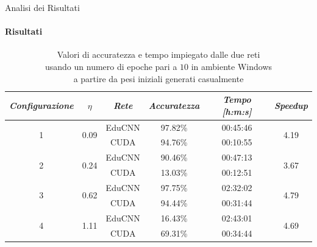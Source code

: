 \documentclass[
 ]{beamer}
\begin{document}
\begin{frame}{Analisi dei Risultati}
    \framesubtitle{Risultati}

        \begin{table}
            \centering
            \renewcommand\arraystretch{1.3}
            \small
            \begin{tabular}{| c | c | c | c | c | c |}
                \hline
                \emph{Configurazione} & $\eta$ & \emph{Rete} & \emph{Accuratezza} & \emph{Tempo [h:m:s]} & \emph{Speedup} \\
                \hline
                \multirow{2}{*}{1} & \multirow{2}{*}{0.09} & EduCNN & 97.82\% & 00:45:46 & \multirow{2}{*}{4.19} \\ \cline{3-5} 
                                   &                       & CUDA   & 94.76\% & 00:10:55  & \\
                \hline
                \multirow{2}{*}{2} & \multirow{2}{*}{0.24} & EduCNN & 90.46\% & 00:47:13 & \multirow{2}{*}{3.67} \\ \cline{3-5} 
                                   &                       & CUDA   & 13.03\% & 00:12:51 & \\
                \hline
                \multirow{2}{*}{3} & \multirow{2}{*}{0.62} & EduCNN & 97.75\% & 02:32:02 & \multirow{2}{*}{4.79} \\ \cline{3-5} 
                                   &                       & CUDA   & 94.44\% & 00:31:44 & \\
                \hline
                \multirow{2}{*}{4} & \multirow{2}{*}{1.11} & EduCNN & 16.43\% & 02:43:01 & \multirow{2}{*}{4.69} \\ \cline{3-5} 
                                   &                       & CUDA   & 69.31\% & 00:34:44 & \\
                \hline
            \end{tabular}
            \caption            
    {Valori di accuratezza e tempo impiegato dalle due reti \\ usando un numero di epoche pari a $10$ in ambiente Windows \\ a partire da pesi iniziali generati casualmente \endtabular}          
        \end{table}    
\end{frame}

\end{document}
